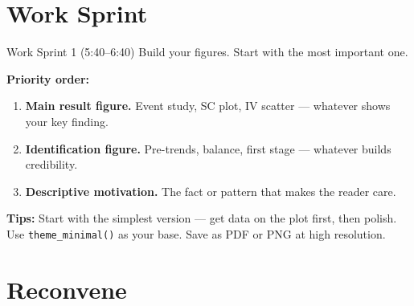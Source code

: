 \section{Work Sprint}

\begin{frame}{Work Sprint 1 (5:40--6:40)}
  Build your figures. Start with the most important one.

  \vspace{6pt}

  \textbf{Priority order:}
  \begin{enumerate}\setlength\itemsep{1pt}
    \item \textbf{Main result figure.} Event study, SC plot, IV scatter --- whatever shows your key finding.
    \item \textbf{Identification figure.} Pre-trends, balance, first stage --- whatever builds credibility.
    \item \textbf{Descriptive motivation.} The fact or pattern that makes the reader care.
  \end{enumerate}

  \vspace{6pt}

  \textbf{Tips:} Start with the simplest version --- get data on the plot first, then polish. Use \texttt{theme\_minimal()} as your base. Save as PDF or PNG at high resolution.
\end{frame}

\section{Reconvene}


